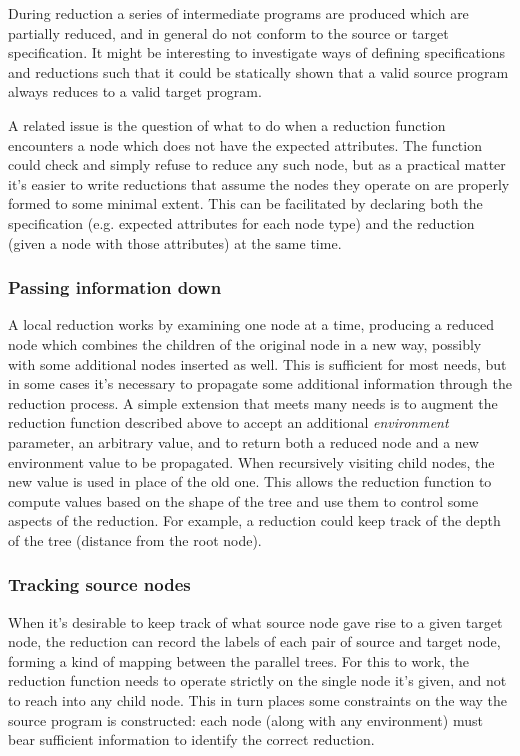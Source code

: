 During reduction a series of intermediate programs are produced which are partially reduced, and in general do not conform to the source or target specification. It might be interesting to investigate ways of defining specifications and reductions such that it could be statically shown that a valid source program always reduces to a valid target program.

A related issue is the question of what to do when a reduction function encounters a node which does not have the expected attributes. The function could check and simply refuse to reduce any such node, but as a practical matter it's easier to write reductions that assume the nodes they operate on are properly formed to some minimal extent. This can be facilitated by declaring both the specification (e.g. expected attributes for each node type) and the reduction (given a node with those attributes) at the same time.


\subsubsection{Passing information down}
A local reduction works by examining one node at a time, producing a reduced node which combines the children of the original node in a new way, possibly with some additional nodes inserted as well. This is sufficient for most needs, but in some cases it's necessary to propagate some additional information through the reduction process. A simple extension that meets many needs is to augment the reduction function described above to accept an additional \emph{environment} parameter, an arbitrary value, and to return both a reduced node and a new environment value to be propagated. When recursively visiting child nodes, the new value is used in place of the old one. This allows the reduction function to compute values based on the shape of the tree and use them to control some aspects of the reduction. For example, a reduction could keep track of the depth of the tree (distance from the root node).



\subsubsection{Tracking source nodes}
When it's desirable to keep track of what source node gave rise to a given target node, the reduction can record the labels of each pair of source and target node, forming a kind of mapping between the parallel trees. For this to work, the reduction function needs to operate strictly on the single node it's given, and not to reach into any child node. This in turn places some constraints on the way the source program is constructed: each node (along with any environment) must bear sufficient information to identify the correct reduction.


